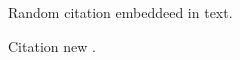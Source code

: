 \documentclass{article}
\begin{document}
Random citation \cite{DUMMY:1} embeddeed in text.

Citation new \cite{greenwade93}.

\newpage

 

\end{document}

